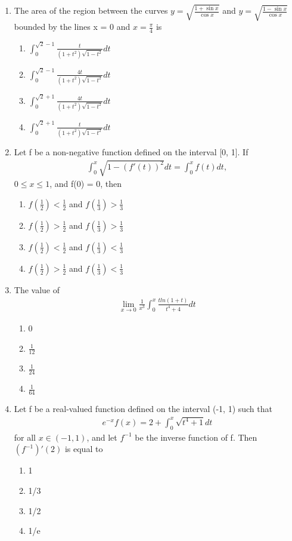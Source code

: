 \begin{enumerate}[label=\arabic*.,ref=\thesubsection.\theenumi]
\item The area of the region between the curves $y = \sqrt{\frac{1 + \sin x}{\cos x}}$ and $y = \sqrt{\frac{1 - \sin x}{\cos x}}$ bounded by the lines x = 0 and $x = \frac{\pi}{4}$ is
\begin{enumerate}
\item $\int_{0}^{\sqrt{2} - 1}\frac{t}{(1 + t^2)\sqrt{1 - t^2}}dt$
\item $\int_{0}^{\sqrt{2} - 1}\frac{4t}{(1 + t^2)\sqrt{1 - t^2}}dt$
\item $\int_{0}^{\sqrt{2} + 1}\frac{4t}{(1 + t^2)\sqrt{1 - t^2}}dt$
\item $\int_{0}^{\sqrt{2} + 1}\frac{t}{(1 + t^2)\sqrt{1 - t^2}}dt$
\end{enumerate}

\item Let f be a non-negative function defined on the interval [0, 1]. If
\begin{align*}
\int_{0}^{x}\sqrt{1 - (f'(t))^2}dt = \int_{0}^{x}f(t)dt,
\end{align*}
$0 \leq x \leq 1$, and f(0) = 0, then
\begin{enumerate}
\item $f(\frac{1}{2}) < \frac{1}{2}$ and $f(\frac{1}{3}) > \frac{1}{3}$
\item $f(\frac{1}{2}) > \frac{1}{2}$ and $f(\frac{1}{3}) > \frac{1}{3}$
\item $f(\frac{1}{2}) < \frac{1}{2}$ and $f(\frac{1}{3}) < \frac{1}{3}$
\item $f(\frac{1}{2}) > \frac{1}{2}$ and $f(\frac{1}{3}) < \frac{1}{3}$
\end{enumerate}

\item The value of 
\begin{align*}
\lim_{x \to 0}\frac{1}{x^3}\int_{0}^{x}\frac{tln(1 + t)}{t^4 + 4}dt
\end{align*}
\begin{enumerate}
\item 0
\item $\frac{1}{12}$
\item $\frac{1}{24}$
\item $\frac{1}{64}$
\end{enumerate}

\item Let f be a real-valued function defined on the interval (-1, 1) such that 
\begin{align*}
e^{-x}f(x) = 2 + \int_{0}^{x}\sqrt{t^4 + 1}dt
\end{align*}
for all $x \in (-1, 1)$, and let $f^{-1}$ be the inverse function of f. Then $(f^{-1})'(2)$ is equal to
\begin{enumerate}
\item 1
\item 1/3
\item 1/2
\item 1/e
\end{enumerate}


\end{enumerate}
